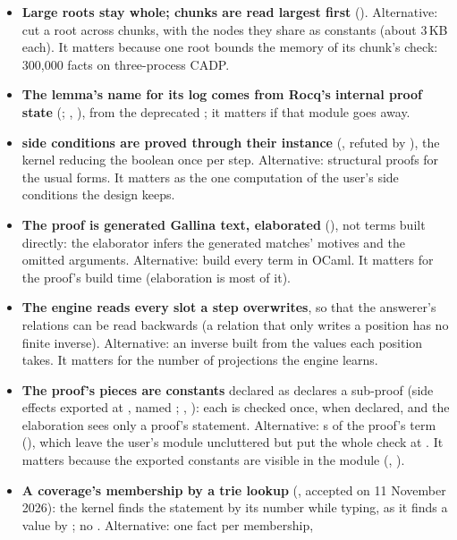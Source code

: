 \begin{itemize}
\item \textbf{Large roots stay whole; chunks are read largest first}
  (). Alternative: cut a root across chunks,
  with the nodes they share as constants (about 3\,KB each). It matters
  because one root bounds the memory of its chunk's check: 300,000 facts
  on three-process CADP.
\item \textbf{The lemma's name for its log comes from Rocq's internal
  proof state} (; ,
  ), from the deprecated
  ; it matters if that module goes away.
\item \textbf{ side conditions are proved through their
  instance} (, refuted by
  ), the kernel reducing the boolean once per
  step. Alternative: structural proofs for the usual forms. It matters as
  the one computation of the user's side conditions the design keeps.
\item \textbf{The proof is generated Gallina text, elaborated}
  (), not terms built directly: the elaborator
  infers the generated matches' motives and the omitted arguments.
  Alternative: build every term in OCaml. It matters for the proof's
  build time (elaboration is most of it).
\item \textbf{The engine reads every slot a step overwrites}, so that the
  answerer's relations can be read backwards (a relation that only writes
  a position has no finite inverse). Alternative: an inverse built from
  the values each position takes. It matters for the number of
  projections the engine learns.
\item \textbf{The proof's pieces are constants} declared as 
  declares a sub-proof (side effects exported at , named
  ; , ):
  each is checked once, when declared, and the elaboration sees only a
  proof's statement. Alternative: s of the proof's term
  (), which leave the user's module uncluttered but
  put the whole check at . It matters because the exported
  constants are visible in the module (, ).
\item \textbf{A coverage's membership by a trie lookup}
  (, accepted on 11 November 2026): the kernel finds
  the statement by its number while typing, as it finds a value by
  ; no . Alternative: one fact per membership,

\end{itemize}
